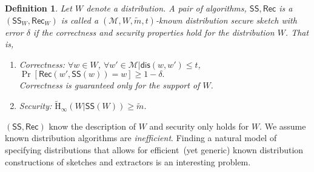 \documentclass[11pt]{article}
\newcommand{\class}[1]{{\ensuremath{\mathsf{#1}}}}
\newcommand{\sketch}{\ensuremath{\class{SS}}\xspace}
\newcommand{\rec}{\ensuremath{\class{Rec}}\xspace}
\newcommand{\dis}{\ensuremath{\mathsf{dis}}}
\newcommand{\Hav}{\tilde{\mathrm{H}}_\infty}
\newtheorem{definition}[theorem]{Definition}
\begin{document}
\begin{definition}
Let $W$ denote a distribution.  A pair of algorithms, $\sketch, \rec$ is a $(\sketch_W, \rec_W)$ is called a $(\mathcal{M}, W, \tilde{m}, t)$-\emph{known distribution secure sketch} with error $\delta$ if the correctness and security properties hold for the distribution $W$.  That is, 
\begin{enumerate}
\item \emph{Correctness:} 
$
\forall w\in W$, $\forall w' \in\mathcal{M}| \dis(w,w')\le t$, $\Pr[\rec(w',\sketch(w))=w]\ge 1-\delta.$\\
Correctness is guaranteed only for the support of $W$.
\item \emph{Security:} $\Hav(W|\sketch(W))\geq \tilde{m}$.
\end{enumerate}
\end{definition}
$(\sketch, \rec)$ know the description of $W$ and security only holds for $W$.  We assume known distribution algorithms are \emph{inefficient}.  Finding a natural model of specifying distributions that allows for efficient~(yet generic) known distribution constructions of sketches and extractors is an interesting problem.
\end{document}
